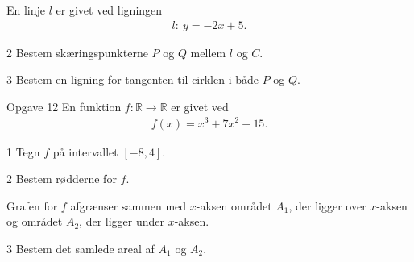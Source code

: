 \begin{meretekst}
	En linje $l$ er givet ved ligningen 
	\begin{align*}
		l: \ y = -2x+5.
	\end{align*}
\end{meretekst}
\begin{delopgave}{}{2}
	Bestem skæringspunkterne $P$ og $Q$ mellem $l$ og $C$. 
\end{delopgave}
\begin{delopgave}{}{3}
	Bestem en ligning for tangenten til cirklen i både $P$ og $Q$.
\end{delopgave}
\begin{opgavetekst}{Opgave 12}
	En funktion $f: \mathbb{R} \to \mathbb{R}$ er givet ved
	\begin{align*}
		f(x) = x^3+7x^2-15.
	\end{align*}	 
\end{opgavetekst}
\begin{delopgave}{}{1}
	Tegn $f$ på intervallet $[-8,4]$.
\end{delopgave}
\begin{delopgave}{}{2}
	Bestem rødderne for $f$. 
\end{delopgave}
\begin{meretekst}
	Grafen for $f$ afgrænser sammen med $x$-aksen området $A_1$, der ligger over $x$-aksen og området $A_2$, der ligger under $x$-aksen.
\end{meretekst}
\begin{delopgave}{}{3}
	Bestem det samlede areal af $A_1$ og $A_2$. 
\end{delopgave}